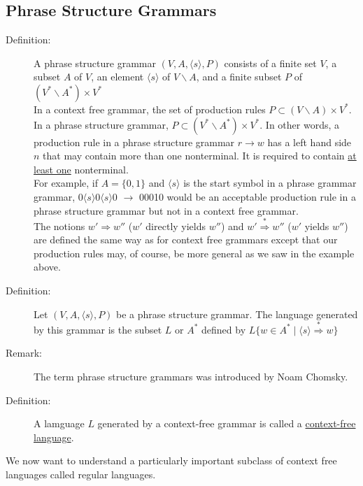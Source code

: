 \documentclass[10pt]{article}
\begin{document}
	\subsection{Phrase Structure Grammars}
	\begin{description}
		\item[Definition:] A phrase structure grammar $(V, A, \langle s\rangle , P)$ consists of a finite set $V$, a subset $A$ of $V$, an element $\langle s\rangle $ of $V \backslash A$, and a finite subset $P$ of $(V^* \backslash A^*) \times V^*$ \\
		In a context free grammar, the set of production rules $P \subset (V \backslash A) \times V^*$. \\
		In a phrase structure grammar, $P \subset (V^* \backslash A^*) \times V^*$. In other words, a production rule in a phrase structure grammar $r \rightarrow w$ has a left hand side $n$ that may contain more than one nonterminal. It is required to contain \underline{at least one} nonterminal. \\
		For example, if $A = \{0, 1\}$ and $\langle s\rangle $ is the start symbol in a phrase grammar grammar, 0$\langle s\rangle $0$\langle s\rangle $0 $\rightarrow$ 00010 would be an acceptable production rule in a phrase structure grammar but not in a context free grammar. \\
		The notions $w' \Rightarrow w''$ ($w'$ directly yields $w''$) and $w' \overset{*}{\Rightarrow} w''$ ($w'$ yields $w''$) are defined the same way as for context free grammars except that our production rules may, of course, be more general as we saw in the example above.
		\item[Definition:] Let $(V, A, \langle s\rangle , P)$ be a phrase structure grammar. The language generated by this grammar is the subset $L$ or $A^*$ defined by $L \{w \in A^* \mid \langle s \rangle \overset{*}{\Rightarrow} w \}$
		\item[Remark:] The term phrase structure grammars was introduced by Noam Chomsky.
		\item[Definition:] A lamguage $L$ generated by a context-free grammar is called a \underline{context-free language}.
	\end{description}
	We now want to understand a particularly important subclass of context free languages called regular languages.
	
\end{document}
